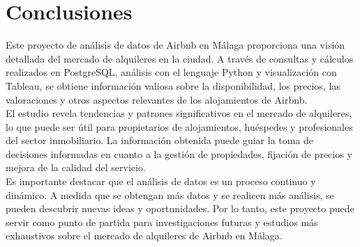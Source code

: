 \section{Conclusiones}
Este proyecto de análisis de datos de Airbnb en Málaga proporciona una visión detallada del mercado de alquileres en la ciudad. A través de consultas y cálculos realizados en PostgreSQL, análisis con el lenguaje Python y visualización con Tableau, se obtiene información valiosa sobre la disponibilidad, los precios, las valoraciones y otros aspectos relevantes de los alojamientos de Airbnb.\\

El estudio revela tendencias y patrones significativos en el mercado de alquileres, lo que puede ser útil para propietarios de alojamientos, huéspedes y profesionales del sector inmobiliario. La información obtenida puede guiar la toma de decisiones informadas en cuanto a la gestión de propiedades, fijación de precios y mejora de la calidad del servicio.\\

Es importante destacar que el análisis de datos es un proceso continuo y dinámico. A medida que se obtengan más datos y se realicen más análisis, se pueden descubrir nuevas ideas y oportunidades. Por lo tanto, este proyecto puede servir como punto de partida para investigaciones futuras y estudios más exhaustivos sobre el mercado de alquileres de Airbnb en Málaga.
\newpage